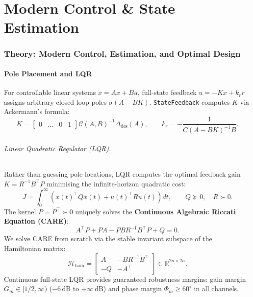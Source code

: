 \documentclass[11pt,a4paper]{article}
\begin{document}
\part{Modern Control \& State Estimation}

\section{Theory: Modern Control, Estimation, and Optimal Design}

\subsection{Pole Placement and LQR}

For controllable linear systems $\dot x = Ax + Bu$, full-state feedback $u = -Kx + k_r r$ assigns arbitrary closed-loop poles $\sigma(A - BK)$. \texttt{StateFeedback} computes $K$ via Ackermann's formula:
\[
K = \begin{bmatrix} 0 & \dots & 0 & 1 \end{bmatrix} \mathcal{C}(A, B)^{-1} \Delta_{\text{des}}(A), \qquad
k_r = -\frac{1}{C(A - BK)^{-1}B} .
\]

\paragraph{Linear Quadratic Regulator (LQR).} Rather than guessing pole locations, LQR computes the optimal feedback gain $K = R^{-1} B^\top P$ minimising the infinite-horizon quadratic cost:
\[
J = \int_0^\infty \left( x(t)^\top Q x(t) + u(t)^\top R u(t) \right) dt, \qquad Q \succeq 0, \quad R \succ 0 .
\]
The kernel $P = P^\top \succ 0$ uniquely solves the \textbf{Continuous Algebraic Riccati Equation (CARE)}:
\[
A^\top P + P A - P B R^{-1} B^\top P + Q = 0 .
\]
We solve CARE from scratch via the stable invariant subspace of the Hamiltonian matrix:
\[
\mathcal{H}_{\text{ham}} = \begin{bmatrix} A & -B R^{-1} B^\top \\ -Q & -A^\top \end{bmatrix} \in \mathbb{R}^{2n \times 2n} .
\]
Continuous full-state LQR provides guaranteed robustness margins: gain margin $G_m \in [1/2, \infty)$ ($-6\,\text{dB}$ to $+\infty\,\text{dB}$) and phase margin $\Phi_m \ge 60^\circ$ in all channels.

\end{document}
